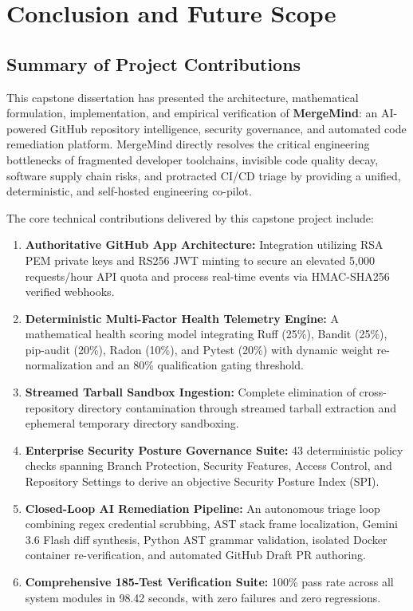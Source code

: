 \documentclass[12pt,a4paper,oneside]{report}
\begin{document}
\cleardoublepage

\chapter{Conclusion and Future Scope}
\label{chap:conclusion-future-scope}

\section{Summary of Project Contributions}
\label{sec:conclusion-summary}

This capstone dissertation has presented the architecture, mathematical formulation, implementation, and empirical verification of \textbf{MergeMind}: an AI-powered GitHub repository intelligence, security governance, and automated code remediation platform. MergeMind directly resolves the critical engineering bottlenecks of fragmented developer toolchains, invisible code quality decay, software supply chain risks, and protracted CI/CD triage by providing a unified, deterministic, and self-hosted engineering co-pilot.

The core technical contributions delivered by this capstone project include:
\begin{enumerate}
    \item \textbf{Authoritative GitHub App Architecture:} Integration utilizing RSA PEM private keys and RS256 JWT minting to secure an elevated 5,000 requests/hour API quota and process real-time events via HMAC-SHA256 verified webhooks.
    \item \textbf{Deterministic Multi-Factor Health Telemetry Engine:} A mathematical health scoring model integrating Ruff (25\%), Bandit (25\%), pip-audit (20\%), Radon (10\%), and Pytest (20\%) with dynamic weight re-normalization and an 80\% qualification gating threshold.
    \item \textbf{Streamed Tarball Sandbox Ingestion:} Complete elimination of cross-repository directory contamination through streamed tarball extraction and ephemeral temporary directory sandboxing.
    \item \textbf{Enterprise Security Posture Governance Suite:} 43 deterministic policy checks spanning Branch Protection, Security Features, Access Control, and Repository Settings to derive an objective Security Posture Index (SPI).
    \item \textbf{Closed-Loop AI Remediation Pipeline:} An autonomous triage loop combining regex credential scrubbing, AST stack frame localization, Gemini 3.6 Flash diff synthesis, Python AST grammar validation, isolated Docker container re-verification, and automated GitHub Draft PR authoring.
    \item \textbf{Comprehensive 185-Test Verification Suite:} 100\% pass rate across all system modules in 98.42 seconds, with zero failures and zero regressions.
\end{enumerate}
\end{document}
